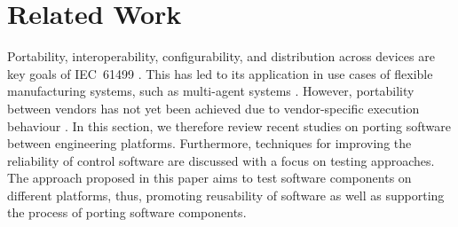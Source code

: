 \section{Related Work}
\label{sec::sota}

Portability, interoperability, configurability, and distribution across devices are key goals of IEC~61499 \cite{jhunjhunwala2024interoperability,hopsu2019portability, batchkova2013dynamic}. 
This has led to its application in use cases of flexible manufacturing systems, such as multi-agent systems \cite{lyu2023multi, xavier2024enhancing}. However, portability between vendors has not yet been achieved due to vendor-specific execution behaviour \cite{misperceptions}. In this section, we therefore review recent studies on porting software between engineering platforms. Furthermore, techniques for improving the reliability of control software are discussed with a focus on testing approaches. The approach proposed in this paper aims to test software components on different platforms, thus, promoting reusability of software as well as supporting the process of porting software components. 

